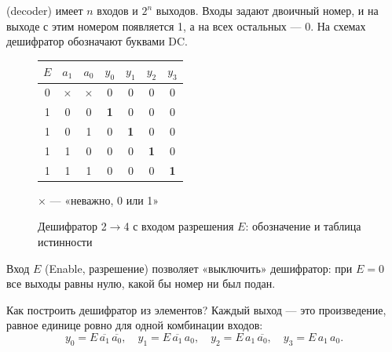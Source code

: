  (decoder) имеет $n$ входов и $2^n$ выходов. Входы задают
двоичный номер, и на выходе с этим номером появляется 1, а на всех остальных
--- 0. На схемах дешифратор обозначают буквами DC.

\begin{figure}[H]
\centering
\begin{minipage}{0.4\textwidth}
\centering
{}
\end{minipage}\hfill
\begin{minipage}{0.56\textwidth}
\centering
\begin{tabular}{ccc|cccc}
\toprule
$E$ & $a_1$ & $a_0$ & $y_0$ & $y_1$ & $y_2$ & $y_3$ \\
\midrule
0 & $\times$ & $\times$ & 0 & 0 & 0 & 0 \\
1 & 0 & 0 & \textbf{1} & 0 & 0 & 0 \\
1 & 0 & 1 & 0 & \textbf{1} & 0 & 0 \\
1 & 1 & 0 & 0 & 0 & \textbf{1} & 0 \\
1 & 1 & 1 & 0 & 0 & 0 & \textbf{1} \\
\bottomrule
\end{tabular}

\smallskip
{\small $\times$ --- «неважно, 0 или 1»}
\end{minipage}
\caption{Дешифратор 2$\to$4 с входом разрешения $E$: обозначение и таблица истинности}
\label{fig:dc24}
\end{figure}

Вход $E$ (Enable, разрешение) позволяет «выключить» дешифратор: при $E=0$
все выходы равны нулю, какой бы номер ни был подан.

Как построить дешифратор из элементов? Каждый выход --- это произведение,
равное единице ровно для одной комбинации входов:
\[
  y_0 = E\,\overline{a_1}\,\overline{a_0}, \quad
  y_1 = E\,\overline{a_1}\,a_0, \quad
  y_2 = E\,a_1\,\overline{a_0}, \quad
  y_3 = E\,a_1\,a_0.
\]

